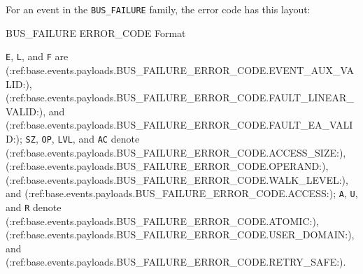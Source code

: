 For an event in the \texttt{BUS\_FAILURE} family, the error code has this layout:

\begin{BedrockListedFormatDiagram}{BUS\_FAILURE ERROR\_CODE Format}
\end{BedrockListedFormatDiagram}
{\small
\texttt{E}, \texttt{L}, and \texttt{F} are (:ref:base.events.payloads.BUS_FAILURE_ERROR_CODE.EVENT_AUX_VALID:),
(:ref:base.events.payloads.BUS_FAILURE_ERROR_CODE.FAULT_LINEAR_VALID:), and (:ref:base.events.payloads.BUS_FAILURE_ERROR_CODE.FAULT_EA_VALID:);
\texttt{SZ}, \texttt{OP}, \texttt{LVL}, and \texttt{AC} denote (:ref:base.events.payloads.BUS_FAILURE_ERROR_CODE.ACCESS_SIZE:),
(:ref:base.events.payloads.BUS_FAILURE_ERROR_CODE.OPERAND:), (:ref:base.events.payloads.BUS_FAILURE_ERROR_CODE.WALK_LEVEL:), and (:ref:base.events.payloads.BUS_FAILURE_ERROR_CODE.ACCESS:); \texttt{A}, \texttt{U}, and
\texttt{R} denote (:ref:base.events.payloads.BUS_FAILURE_ERROR_CODE.ATOMIC:), (:ref:base.events.payloads.BUS_FAILURE_ERROR_CODE.USER_DOMAIN:), and (:ref:base.events.payloads.BUS_FAILURE_ERROR_CODE.RETRY_SAFE:).
\par}

